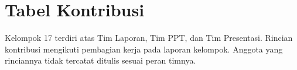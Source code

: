 \section{Tabel Kontribusi}
\label{sec:kontribusi}

Kelompok 17 terdiri atas Tim Laporan, Tim PPT, dan Tim Presentasi. Rincian kontribusi mengikuti pembagian kerja pada laporan kelompok. Anggota yang rinciannya tidak tercatat ditulis sesuai peran timnya.

{\small

}
